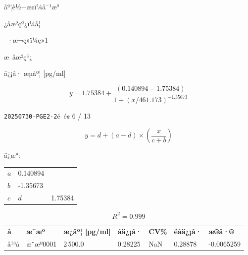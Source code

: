 \documentclass[UTF8,10pt,a4paper,fontset=fandol]{ctexart}
\newcommand{\fieldvalue}[1]{#1}
\begin{document}
\begin{center}
\begin{center}
åº¦è½¬æ¢ï¼\fieldvalue{å¯¹æ°}

¿å­æ²çº¿ï¼\fieldvalue{å¦}

 ·æ¬ç»ï¼\fieldvalue{ç»1}

\begin{center}
\large æ åæ²çº¿
\end{center}

\begin{center}
\end{center}

\begin{center}
\small
ä¿¡å· \hspace{5cm} æµåº¦ [pg/ml]
\end{center}

\[
y = 1.75384 + \frac{(0.140894 - 1.75384)}
 {1 + (x/461.173)^{-1.35673}}
\]

\newpage

\texttt{20250730-PGE2-2}\hfill é é¢ 6 / 13

\[
y=d+(a-d)\times\left(\frac{x}{c+b}\right)
\]

ä¿æ°:

\begin{tabular}{ll}
$a$ &
\fieldvalue{0.140894} \\[2pt]
$b$ &
\fieldvalue{-1.35673} \\[2pt]
$c$ &
$d$ &
\fieldvalue{1.75384}
\end{tabular}

\[
R^2 =
\fieldvalue{0.999}
\]

\small
\begin{tabularx}{\textwidth}{l l l l l l l}
\textbf{å­} & \textbf{æ¨æº} & \textbf{æ¿åº¦ [pg/ml]} &
\textbf{åä¿¡å·} & \textbf{CV\%} & \textbf{éåä¿¡å·} & \textbf{æ®å·®} \\
å¹³å &
\fieldvalue{æ¨æº0001} &
\fieldvalue{2\,500.0} &
\fieldvalue{0.28225} &
\fieldvalue{NaN} &
\fieldvalue{0.28878} &
\fieldvalue{-0.0065259} \\


\end{tabularx}
\end{center}
\end{center}
\end{document}
